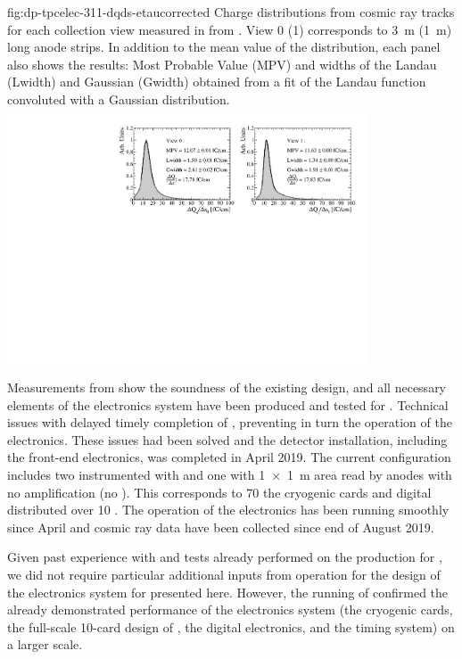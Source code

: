 \begin{dunefigure}{fig:dp-tpcelec-311-dqds-etaucorrected}
{Charge distributions from cosmic ray tracks for each collection view measured in   from \cite{Aimard:2018yxp}. View \num{0} (\num{1}) corresponds to \SI{3}{\meter} (\SI{1}{\meter}) long anode strips. In addition to the mean value of the distribution, each panel also shows the results: Most Probable Value (MPV) and widths of the Landau (Lwidth) and Gaussian (Gwidth) obtained from a fit of the Landau function convoluted with a Gaussian distribution.}
\includegraphics[width=0.8\textwidth]{graphics/dp-tpcelec-311-dqds-etaucorrected}
\end{dunefigure}

Measurements from  show the soundness of the existing design, and all necessary elements of the  electronics system have been produced and tested for . Technical issues with  delayed timely completion of , preventing in turn the operation of the electronics. These issues had been solved and the detector installation, including the front-end electronics, was completed in April 2019. The current  configuration includes two  instrumented with  and one  with \SI[product-units=power]{1x1}{m} area read by anodes with no amplification (no ). This corresponds to \num{70} the cryogenic  cards and digital  distributed over \num{10} . The operation of the  electronics has been running smoothly since April and cosmic ray data have been collected since end of August 2019.  

Given past experience with  and tests already performed on the production for , we did not require particular additional inputs from  operation for the design of the electronics system for  presented here. However, the running of  confirmed the already demonstrated performance of the electronics system (the cryogenic  cards, the full-scale \num{10}-card design of , the digital  electronics, and the timing system) on a larger scale.  

